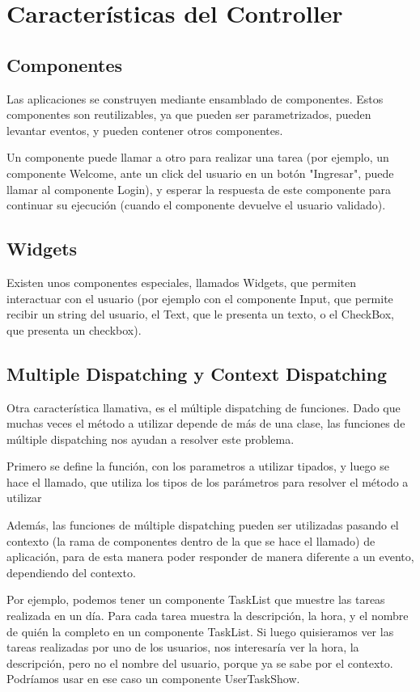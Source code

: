\section{Características del Controller}
\subsection{Componentes}
\label{sub-comp}

Las aplicaciones se construyen mediante ensamblado de componentes. Estos componentes son reutilizables,
ya que pueden ser parametrizados, pueden levantar eventos, y pueden contener otros componentes.

Un componente puede llamar a otro para realizar una tarea (por ejemplo, un componente Welcome, ante un click
del usuario en un botón "Ingresar", puede llamar al componente Login), y esperar la respuesta de este
componente para continuar su ejecución (cuando el componente devuelve el usuario validado).

\subsection{Widgets}
\label{sub-widget}

Existen unos componentes especiales, llamados Widgets, que permiten interactuar con el usuario (por ejemplo
con el componente Input, que permite recibir un string del usuario, el Text, que le presenta un texto, o el
CheckBox, que presenta un checkbox).

\subsection{Multiple Dispatching y Context Dispatching}
\label{sub-dispatch}
Otra característica llamativa, es el múltiple dispatching de funciones.
Dado que muchas veces el método a utilizar depende de más de una clase, las funciones de múltiple dispatching nos ayudan a resolver este problema.

Primero se define la función, con los parametros a utilizar tipados, y luego se hace el llamado, que utiliza los tipos de los parámetros para resolver el método a utilizar

Además, las funciones de múltiple dispatching pueden ser utilizadas pasando el contexto (la rama de componentes dentro de la que se hace el llamado) de aplicación, para de esta manera poder responder de manera diferente a un evento, dependiendo del contexto.

Por ejemplo, podemos tener un componente TaskList que muestre las tareas realizada en un día. Para cada tarea muestra la descripción, la hora, y el nombre de quién la completo en un componente TaskList. Si luego quisieramos ver las tareas realizadas por uno de los usuarios, nos interesaría ver la hora, la descripción, pero no el nombre del usuario, porque ya se sabe por el contexto. Podríamos usar en ese caso un componente UserTaskShow.

